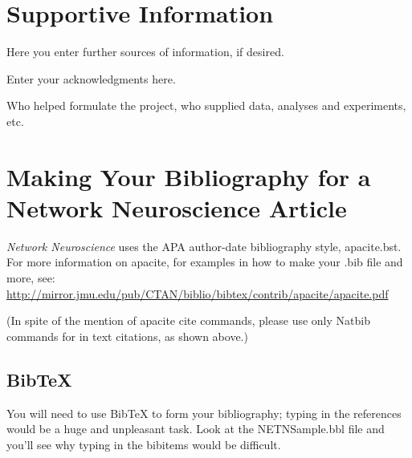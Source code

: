 \documentclass[NETN]{stjour}
\begin{document}
\section{Supportive Information}
Here you enter further sources of information, if desired.



\acknowledgments
Enter your acknowledgments here.



\authorcontributions 
Who helped formulate the project, who supplied data, analyses and
experiments, etc.





\section{Making Your Bibliography for a Network Neuroscience Article}
{\it Network Neuroscience} uses the APA author-date  bibliography style,
apacite.bst. For more
information on apacite, for examples in how to make your .bib file and more, see:\\
\href{http://mirror.jmu.edu/pub/CTAN/biblio/bibtex/contrib/apacite/apacite.pdf}
{http://mirror.jmu.edu/pub/CTAN/biblio/bibtex/contrib/apacite/apacite.pdf}

\noindent
(In spite of the mention of apacite cite commands, please use only
Natbib commands for in text citations, as shown above.)

\subsection{BibTeX}
You will need to use BibTeX to form your bibliography; typing in the
references would be
a huge and unpleasant task. Look at the NETNSample.bbl file and you'll see why
typing in the bibitems would be difficult. 
\end{document}
